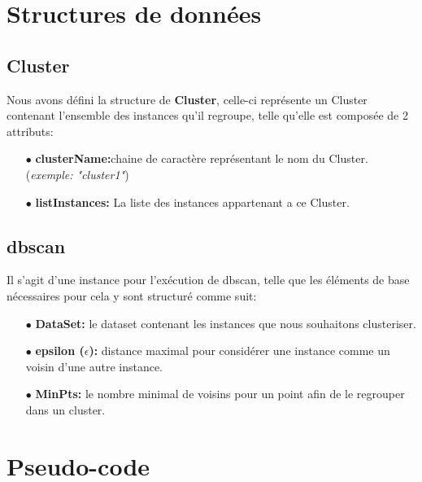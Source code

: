 \documentclass[12pt,a4paper,oneside]{book}
\begin{document}
	
	\section{Structures de données}
	\subsection*{Cluster}
	Nous avons défini la structure de \textbf{Cluster}, celle-ci représente un Cluster contenant l'ensemble des instances qu'il regroupe, telle qu'elle est composée de 2 attributs:
	\begin{itemize}
		\item[$\bullet$] \textbf{clusterName:}chaine de caractère représentant le nom du Cluster. (\textit{exemple: "cluster1"})
		\item[$\bullet$] \textbf{listInstances:} La liste des instances appartenant a ce Cluster.
	\end{itemize}
	
	\subsection*{dbscan}
	Il s'agit d'une instance pour l'exécution de dbscan, telle que les éléments de base nécessaires pour cela y sont structuré comme suit:
	\begin{itemize}
		\item[$\bullet$] \textbf{DataSet:} le dataset contenant les instances que nous souhaitons clusteriser.
		\item[$\bullet$] \textbf{epsilon ($\epsilon$):} distance maximal pour considérer une instance comme un voisin d'une autre instance.
		\item[$\bullet$] \textbf{MinPts:} le nombre minimal de voisins pour un point afin de le regrouper dans un cluster.
		
	\end{itemize}
	
	
	
	
	\section{Pseudo-code}
	
\end{document}
